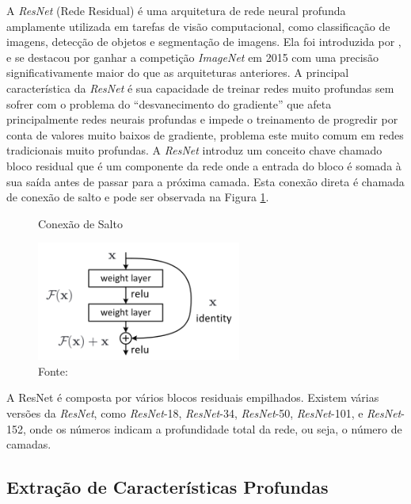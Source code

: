 A \textit{ResNet} (Rede Residual) é uma arquitetura de rede neural profunda amplamente utilizada em tarefas de visão computacional, como classificação de imagens, detecção de objetos e segmentação de imagens. Ela foi introduzida por , e se destacou por ganhar a competição \textit{ImageNet} em 2015 com uma precisão significativamente maior do que as arquiteturas anteriores. A principal característica da \textit{ResNet} é sua capacidade de treinar redes muito profundas sem sofrer com o problema do ``desvanecimento do gradiente'' que afeta principalmente redes neurais profundas e impede o treinamento de progredir por conta de valores muito baixos de gradiente, problema este muito comum em redes tradicionais muito profundas. A \textit{ResNet} introduz um conceito chave chamado bloco residual que é um componente da rede onde a entrada do bloco é somada à sua saída antes de passar para a próxima camada. Esta conexão direta é chamada de conexão de salto e pode ser observada na Figura \ref{fig:fig013}.

\begin{figure}[h!]
    \centering
    \caption{Conexão de Salto}
    \includegraphics[width=0.6\textwidth]{figures/fig013.png}
    \caption*{Fonte: \cite{aiSelfAttentionBasedFusion2023}}
    \label{fig:fig013}
\end{figure}

A ResNet é composta por vários blocos residuais empilhados.
Existem várias versões da \textit{ResNet}, como \textit{ResNet}-18, \textit{ResNet}-34, \textit{ResNet}-50, \textit{ResNet}-101, e \textit{ResNet}-152, onde os números indicam a profundidade total da rede, ou seja, o número de camadas.

\subsection{Extração de Características Profundas}
\label{subsec:extract_features}

